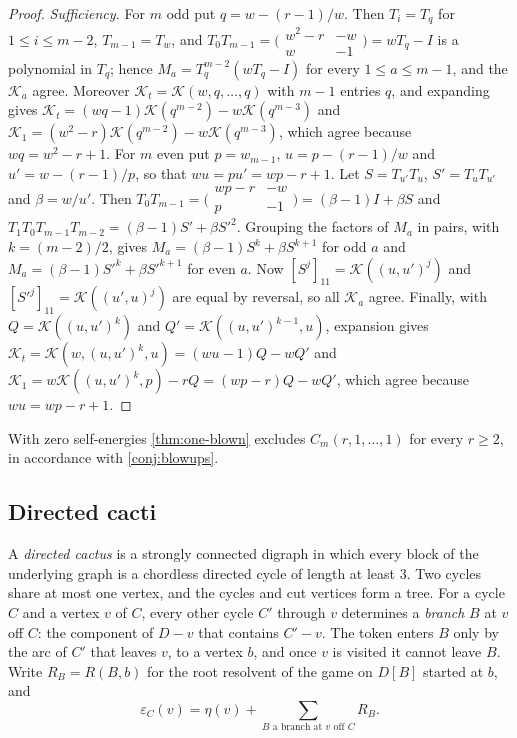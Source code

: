 \documentclass[11pt]{amsart}
\theoremstyle{plain}
\theoremstyle{definition}
\theoremstyle{remark}
\numberwithin{equation}{section}
\newcommand{\cont}{\mathcal{K}}           %
\begin{document}
\begin{proof}
\emph{Sufficiency.} For $m$ odd put $q=w-(r-1)/w$. Then $T_i=T_q$ for $1\le i\le m-2$, $T_{m-1}=T_w$, and $T_0T_{m-1}=\bigl(\begin{smallmatrix}w^2-r&-w\\w&-1\end{smallmatrix}\bigr)=wT_q-I$ is a polynomial in $T_q$; hence $M_a=T_q^{m-2}(wT_q-I)$ for every $1\le a\le m-1$, and the $\cont_a$ agree. Moreover $\cont_t=\cont(w,q,\dots,q)$ with $m-1$ entries $q$, and expanding gives $\cont_t=(wq-1)\cont(q^{m-2})-w\cont(q^{m-3})$ and $\cont_1=(w^2-r)\cont(q^{m-2})-w\cont(q^{m-3})$, which agree because $wq=w^2-r+1$. For $m$ even put $p=w_{m-1}$, $u=p-(r-1)/w$ and $u'=w-(r-1)/p$, so that $wu=pu'=wp-r+1$. Let $S=T_{u'}T_u$, $S'=T_uT_{u'}$ and $\beta=w/u'$. Then $T_0T_{m-1}=\bigl(\begin{smallmatrix}wp-r&-w\\p&-1\end{smallmatrix}\bigr)=(\beta-1)I+\beta S$ and $T_1T_0T_{m-1}T_{m-2}=(\beta-1)S'+\beta S'^2$. Grouping the factors of $M_a$ in pairs, with $k=(m-2)/2$, gives $M_a=(\beta-1)S^{k}+\beta S^{k+1}$ for odd $a$ and $M_a=(\beta-1)S'^{k}+\beta S'^{k+1}$ for even $a$. Now $[S^{j}]_{11}=\cont((u,u')^{j})$ and $[S'^{j}]_{11}=\cont((u',u)^{j})$ are equal by reversal, so all $\cont_a$ agree. Finally, with $Q=\cont((u,u')^{k})$ and $Q'=\cont((u,u')^{k-1},u)$, expansion gives $\cont_t=\cont(w,(u,u')^{k},u)=(wu-1)Q-wQ'$ and $\cont_1=w\cont((u,u')^{k},p)-rQ=(wp-r)Q-wQ'$, which agree because $wu=wp-r+1$.
\end{proof}

With zero self-energies \cref{thm:one-blown} excludes $C_m(r,1,\dots,1)$ for every $r\ge2$, in accordance with \cref{conj:blowups}.

\subsection{Directed cacti}
A \emph{directed cactus} is a strongly connected digraph in which every block of the underlying graph is a chordless directed cycle of length at least $3$. Two cycles share at most one vertex, and the cycles and cut vertices form a tree. For a cycle $C$ and a vertex $v$ of $C$, every other cycle $C'$ through $v$ determines a \emph{branch} $B$ at $v$ off $C$: the component of $D-v$ that contains $C'-v$. The token enters $B$ only by the arc of $C'$ that leaves $v$, to a vertex $b$, and once $v$ is visited it cannot leave $B$. Write $R_B=R(B,b)$ for the root resolvent of the game on $D[B]$ started at $b$, and
\[
\varepsilon_C(v)=\eta(v)+\sum_{B\text{ a branch at }v\text{ off }C}R_B.
\]
\end{document}
